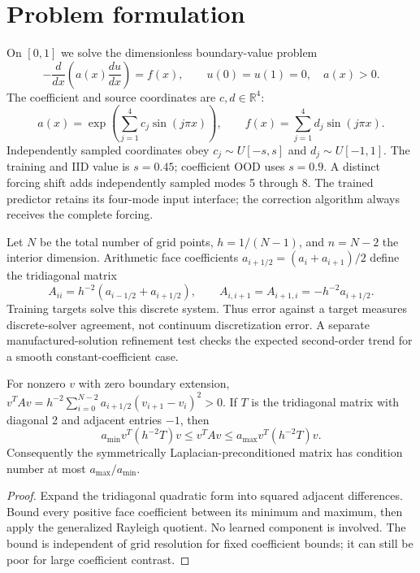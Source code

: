 \section{Problem formulation}
On $[0,1]$ we solve the dimensionless boundary-value problem
\begin{equation}
 -\frac{d}{dx}\left(a(x)\frac{du}{dx}\right)=f(x),\qquad u(0)=u(1)=0,\quad a(x)>0.
\end{equation}
The coefficient and source coordinates are $c,d\in\mathbb R^4$:
\begin{equation}
 a(x)=\exp\!\left(\sum_{j=1}^{4}c_j\sin(j\pi x)\right),\qquad
 f(x)=\sum_{j=1}^{4}d_j\sin(j\pi x).
\end{equation}
Independently sampled coordinates obey $c_j\sim U[-s,s]$ and $d_j\sim U[-1,1]$. The training and IID value is $s=0.45$; coefficient OOD uses $s=0.9$. A distinct forcing shift adds independently sampled modes 5 through 8. The trained predictor retains its four-mode input interface; the correction algorithm always receives the complete forcing.

Let $N$ be the total number of grid points, $h=1/(N-1)$, and $n=N-2$ the interior dimension. Arithmetic face coefficients $a_{i+1/2}=(a_i+a_{i+1})/2$ define the tridiagonal matrix
\begin{equation}
 A_{ii}=h^{-2}(a_{i-1/2}+a_{i+1/2}),\qquad A_{i,i+1}=A_{i+1,i}=-h^{-2}a_{i+1/2}.
\end{equation}
Training targets solve this discrete system. Thus error against a target measures discrete-solver agreement, not continuum discretization error. A separate manufactured-solution refinement test checks the expected second-order trend for a smooth constant-coefficient case.

\begin{proposition}
For nonzero $v$ with zero boundary extension,
$v^TAv=h^{-2}\sum_{i=0}^{N-2}a_{i+1/2}(v_{i+1}-v_i)^2>0$.
If $T$ is the tridiagonal matrix with diagonal 2 and adjacent entries $-1$, then
\begin{equation}
 a_{\min} v^T(h^{-2}T)v\le v^TAv\le a_{\max}v^T(h^{-2}T)v.
\end{equation}
Consequently the symmetrically Laplacian-preconditioned matrix has condition number at most $a_{\max}/a_{\min}$.
\end{proposition}
\begin{proof}
Expand the tridiagonal quadratic form into squared adjacent differences. Bound every positive face coefficient between its minimum and maximum, then apply the generalized Rayleigh quotient. No learned component is involved. The bound is independent of grid resolution for fixed coefficient bounds; it can still be poor for large coefficient contrast.
\end{proof}


